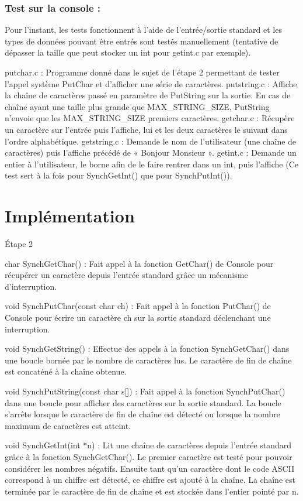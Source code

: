 \documentclass{book}
\begin{document}
\section{Test sur la console :}
Pour l’instant, les tests fonctionnent à l’aide de l’entrée/sortie standard et les types de données pouvant être entrés sont testés manuellement (tentative de dépasser la taille que peut stocker un int pour getint.c par exemple).

putchar.c : Programme donné dans le sujet de l’étape 2 permettant de tester l’appel système PutChar et d’afficher une série de caractères.
putstring.c : Affiche la chaîne de caractères passé en paramètre de PutString sur la sortie. En cas de chaîne ayant une taille plus grande que MAX\_STRING\_SIZE, PutString n’envoie que les  MAX\_STRING\_SIZE premiers caractères.
getchar.c : Récupère un caractère sur l’entrée puis l’affiche, lui et les deux caractères le suivant dans l’ordre alphabétique.
getstring.c : Demande le nom de l’utilisateur (une chaîne de caractères) puis l’affiche précédé de « Bonjour Monsieur ».
 getint.c : Demande un entier à l’utilisateur, le borne afin de le faire rentrer dans un int, puis l’affiche (Ce test sert à la fois pour SynchGetInt() que pour SynchPutInt()).

\part{Implémentation}

Étape 2

char SynchGetChar() :
Fait appel à la fonction GetChar() de Console pour récupérer un caractère depuis l'entrée standard grâce un mécanisme d'interruption.

void SynchPutChar(const char ch) : 
Fait appel à la fonction PutChar() de Console pour écrire un caractère ch sur la sortie standard déclenchant une interruption.

void SynchGetString() : 
Effectue des appels à la fonction SynchGetChar() dans une boucle bornée par le nombre de caractères lus. Le caractère de fin de chaîne est concaténé à la chaîne obtenue.

void SynchPutString(const char s[]) : 
Fait appel à la fonction SynchPutChar() dans une boucle pour afficher des caractères sur la sortie standard. La boucle s'arrête lorsque le caractère de fin de chaîne est détecté ou lorsque la nombre maximum de caractères est atteint.  

void SynchGetInt(int *n) : 
Lit une chaîne de caractères depuis l'entrée standard grâce à la fonction SynchGetChar(). Le premier caractère est testé pour pouvoir considérer les nombres négatifs. Ensuite tant qu'un caractère dont le code ASCII correspond à un chiffre est détecté, ce chiffre est ajouté à la chaîne. La chaîne est terminée par le caractère de fin de chaîne et est stockée dans l’entier pointé par n.
\end{document}
